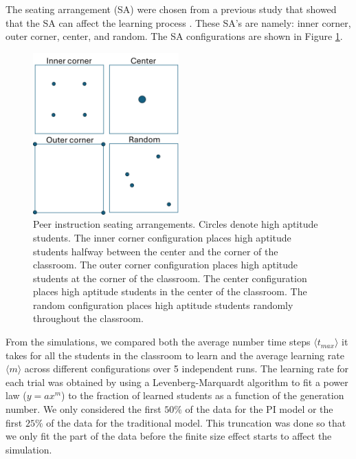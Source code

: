 The seating arrangement (SA) were chosen from a previous study that showed that the SA can affect the learning process \cite{roxas2010seating}. These SA's are namely: inner corner, outer corner, center, and random. The SA configurations are shown in Figure \ref{fig:PI SAs}.

 \begin{figure}[h!]
    \centering
    \includegraphics[width=0.5\textwidth]{figures/PI SAs.png}
    \caption[Peer instruction seating arrangements.]{ Peer instruction seating arrangements. Circles denote high aptitude students. The inner corner configuration places high aptitude students halfway between the center and the corner of the classroom. The outer corner configuration places high aptitude students at the corner of the classroom. The center configuration places high aptitude students in the center of the classroom. The random configuration places high aptitude students randomly throughout the classroom.}
    \label{fig:PI SAs}
 \end{figure}

 From the simulations, we compared both the average number time steps $\langle t_{max} \rangle$ it takes for all the students in the classroom to learn and the average learning rate $\langle m \rangle$ across different configurations over 5 independent runs. The learning rate for each trial was obtained by using a Levenberg-Marquardt algorithm to fit a power law ($y = ax^m$) to the fraction of learned students as a function of the generation number. We only considered the first $50\%$ of the data for the PI model or the first $25\%$ of the data for the traditional model. This truncation was done so that we only fit the part of the data before the finite size effect starts to affect the simulation.

